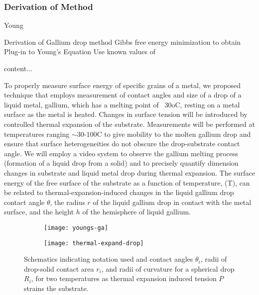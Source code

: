 
\subsubsection{Derivation of Method}

Young 
\begin{outline}[enumerate]

	\1 Derivation of Gallium drop method %
		\2 Gibbs free energy minimization to obtain \gamSL
		\2 Plug-in \gamSL to Young's Equation
		\2 Use known values of \gamLV
	
	
	content...
\end{outline}

To properly measure surface energy of specific grains of a metal, we proposed technique that employs measurement of contact angles and size of a drop of a liquid metal, gallium, which has a melting point of ~30oC, resting on a metal surface as the metal is heated. Changes in surface tension will be introduced by controlled thermal expansion of the substrate. Measurements will be performed at temperatures ranging $\sim$30-100\degree C to give mobility to the molten gallium drop and ensure that surface heterogeneities do not obscure the drop-substrate contact angle. We will employ a video system to observe the gallium melting process (formation of a liquid drop from a solid) and to precisely quantify dimension changes in substrate and liquid metal drop during thermal expansion. The surface energy of the free surface of the substrate as a function of temperature, \gamSV(T), can be related to thermal-expansion-induced changes in the liquid gallium drop contact angle $\theta$, the radius $r$ of the liquid gallium drop in contact with the metal surface, and the height $h$ of the hemisphere of liquid gallium. 
\begin{figure}\label{fig:therm-exp-ga}
	\centering
	\begin{subfigure}[b]{0.5\textwidth}
		\texttt{[image: youngs-ga]}
		\label{fig:youngs-ga}
	\end{subfigure}
	\begin{subfigure}[b]{0.5\textwidth}
		\texttt{[image: thermal-expand-drop]}
		\label{fig:thermal-expand-drop}
	\end{subfigure}
	\caption{Schematics indicating notation used and contact angles $\theta_{i}$, radii of drop-solid contact area $r_{i}$, and radii of curvature for a spherical drop $R_{i}$, for two temperatures as thermal expansion induced tension $P$ strains the substrate.}
\end{figure}
